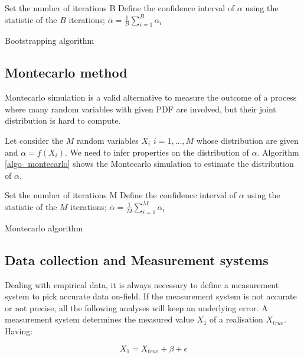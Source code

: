 \begin{algorithm}[H]
\DontPrintSemicolon
\SetAlgoLined
Set the number of iterations B\;
Define the confidence interval of $\alpha$ using the statistic of the $B$ iterations; $\bar{\alpha}=\frac{1}{B}\sum_{i=1}^{B}\alpha_i$ \;
\caption{Bootstrapping algorithm}
\label{algo_bootstrap}
\end{algorithm}

\subsection{Montecarlo method} \label{secMontecarlo}
Montecarlo simulation is a valid alternative to measure the outcome of a process where many random variables with given PDF are involved, but their joint distribution is hard to compute. \par

Let consider the $M$ random variables $X_i$ $i=1,\ldots,M$ whose distribution are given and $\alpha=f(X_i)$. We need to infer properties on the distribution of $\alpha$. Algorithm \ref{algo_montecarlo} shows the Montecarlo simulation to estimate the distribution of $\alpha$. 

\begin{algorithm}[H]
\DontPrintSemicolon
\SetAlgoLined
Set the number of iterations M\;
Define the confidence interval of $\alpha$ using the statistic of the $M$ iterations; $\bar{\alpha}=\frac{1}{M}\sum_{i=1}^{M}\alpha_i$ \;
\caption{Montecarlo algorithm}
\label{algo_montecarlo}
\end{algorithm}

\subsection{Data collection and Measurement systems} \label{secMeasurementSystem}
Dealing with empirical data, it is always necessary to define a measurement system to pick accurate data on-field. If the measurement system is not accurate or not precise, all the following analyses will keep an underlying error. A measurement system determines the measured value $X_1$ of a realisation $X_{true}$. Having:

\begin{equation}
X_1=X_{true}+\beta+\epsilon
\label{eq_measurement1}
\end{equation}

